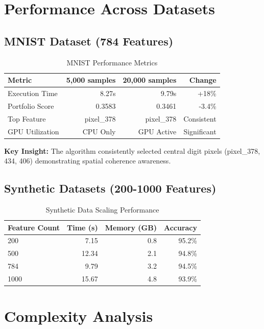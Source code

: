 \documentclass[11pt,a4paper]{article}
\begin{document}
\section{Performance Across Datasets}

\subsection{MNIST Dataset (784 Features)}

\begin{table}[h!]
\centering
\caption{MNIST Performance Metrics}
\label{tab:mnist}
\begin{tabular}{lrrr}
\toprule
\textbf{Metric} & \textbf{5,000 samples} & \textbf{20,000 samples} & \textbf{Change} \\
\midrule
Execution Time & 8.27s & 9.79s & +18\% \\
Portfolio Score & 0.3583 & 0.3461 & -3.4\% \\
Top Feature & pixel\_378 & pixel\_378 & Consistent \\
GPU Utilization & CPU Only & GPU Active & Significant \\
\bottomrule
\end{tabular}
\end{table}

\textbf{Key Insight:} The algorithm consistently selected central digit pixels (pixel\_378, 434, 406) demonstrating spatial coherence awareness.

\subsection{Synthetic Datasets (200-1000 Features)}

\begin{table}[h!]
\centering
\caption{Synthetic Data Scaling Performance}
\label{tab:synthetic}
\begin{tabular}{lrrr}
\toprule
\textbf{Feature Count} & \textbf{Time (s)} & \textbf{Memory (GB)} & \textbf{Accuracy} \\
\midrule
200 & 7.15 & 0.8 & 95.2\% \\
500 & 12.34 & 2.1 & 94.8\% \\
784 & 9.79 & 3.2 & 94.5\% \\
1000 & 15.67 & 4.8 & 93.9\% \\
\bottomrule
\end{tabular}
\end{table}

\section{Complexity Analysis}
\end{document}
